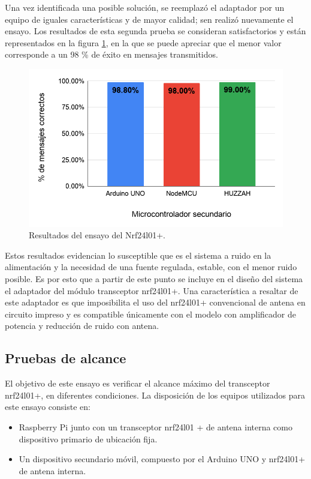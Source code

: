 Una vez identificada una posible solución, se reemplazó el adaptador por un equipo de iguales características y de mayor calidad; sen realizó nuevamente el ensayo. Los resultados de esta segunda prueba se consideran satisfactorios y están representados en la figura \ref{fig:figura_b}, en la que se puede apreciar que el menor valor corresponde a un 98 \% de éxito en mensajes transmitidos.


\begin{figure}[ht]
	\centering
	\includegraphics[scale=.45]{./Figures/Capitulo4/Figura_B.png}
	\caption{Resultados del ensayo del Nrf24l01+.}
	\label{fig:figura_b}
\end{figure}

Estos resultados evidencian lo susceptible que es el sistema a ruido en la alimentación y la necesidad de una fuente regulada, estable, con el menor ruido posible. Es por esto que a partir de este punto se incluye en el diseño del sistema el adaptador del módulo transceptor nrf24l01+. Una característica a resaltar de este adaptador es que imposibilita el uso del nrf24l01+ convencional de antena en circuito impreso y es compatible únicamente con el modelo con amplificador de potencia y reducción de ruido con antena.


\subsection{Pruebas de alcance}
 

El objetivo de este ensayo es verificar el alcance máximo del transceptor nrf24l01+, en diferentes condiciones. La disposición de los equipos utilizados para este ensayo consiste en:

\begin{itemize}
\item Raspberry Pi junto con un transceptor nrf24l01 + de antena interna como dispositivo primario de ubicación fija.
\item Un dispositivo secundario móvil, compuesto por el Arduino UNO y nrf24l01+ de antena interna.
\end{itemize}

